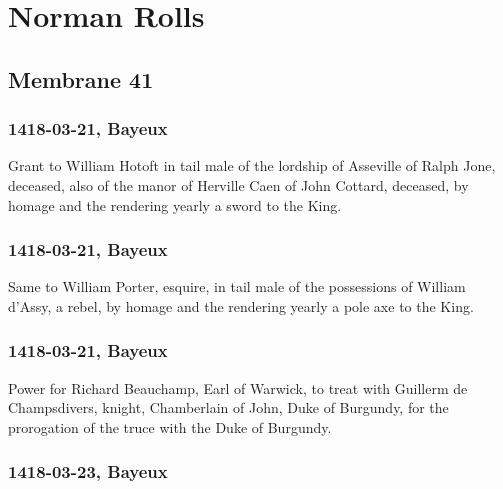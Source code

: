 \documentclass[a4paper,12pt,twoside]{book}
\begin{document}
            
            \newpage
            \chapter{Norman Rolls}
            
            \section{Membrane 41}
            
            
                
                \subsection{1418-03-21, Bayeux}
                
                
                  Grant to William Hotoft in tail male of the lordship of Asseville of Ralph Jone, deceased, also of the manor of Herville Caen of John Cottard, deceased, by homage and the rendering yearly a sword to the King.
               
                
                \subsection{1418-03-21, Bayeux}
                
                
                  Same to William Porter, esquire, in tail male of the possessions of William d'Assy, a rebel, by homage and the rendering yearly a pole axe to the King.
               
                
                \subsection{1418-03-21, Bayeux}
                
                
                  Power for Richard Beauchamp, Earl of Warwick, to treat with Guillerm de Champsdivers, knight, Chamberlain of John, Duke of Burgundy, for the prorogation of the truce with the Duke of Burgundy.
               
                
                \subsection{1418-03-23, Bayeux}
                
\end{document}
